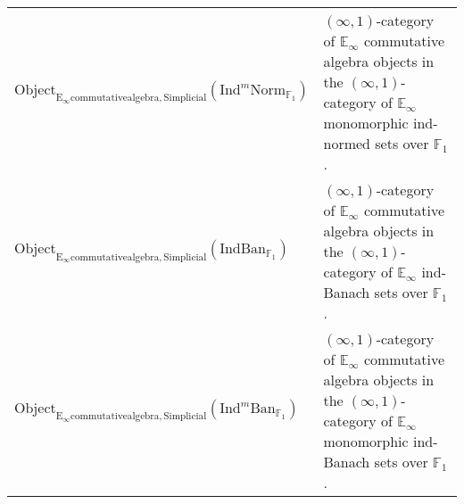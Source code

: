 \documentclass[11pt]{book}
\theoremstyle{definition}
\numberwithin{equation}{section}
\begin{document}
\begin{center}
\begin{tabularx}{\linewidth}{lX}
$\mathrm{Object}_{\mathrm{E}_\infty\mathrm{commutativealgebra},\mathrm{Simplicial}}(\mathrm{Ind}^m\mathrm{Norm}_{\mathbb{F}_1})$ & $(\infty,1)$-category of $\mathbb{E}_\infty$ commutative algebra objects in the $(\infty,1)$-category of $\mathbb{E}_\infty$ monomorphic ind-normed sets over $\mathbb{F}_1$. \\
$\mathrm{Object}_{\mathrm{E}_\infty\mathrm{commutativealgebra},\mathrm{Simplicial}}(\mathrm{IndBan}_{\mathbb{F}_1})$& $(\infty,1)$-category of $\mathbb{E}_\infty$ commutative algebra objects in the $(\infty,1)$-category of $\mathbb{E}_\infty$ ind-Banach sets over $\mathbb{F}_1$. \\
$\mathrm{Object}_{\mathrm{E}_\infty\mathrm{commutativealgebra},\mathrm{Simplicial}}(\mathrm{Ind}^m\mathrm{Ban}_{\mathbb{F}_1})$& $(\infty,1)$-category of $\mathbb{E}_\infty$ commutative algebra objects in the $(\infty,1)$-category of $\mathbb{E}_\infty$ monomorphic ind-Banach sets over $\mathbb{F}_1$. \\


\end{tabularx}
\end{center}
\end{document}
